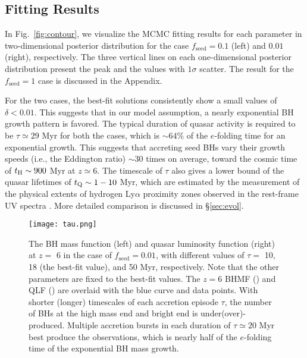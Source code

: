 \documentclass[twocolumn, twocolappendix]{aastex63}
\newcommand{\tlife}{\tau}
\newcommand{\fseed}{f_\mathrm{seed}}
\newcommand{\red}[1]{\textcolor{red}{ #1}}
\begin{document}
\begin{CJK*}{UTF8}{gbsn}
\vspace{2mm}
\subsection{Fitting Results}\label{sec:fitting_result}
In Fig.~\ref{fig:contour}, we visualize the MCMC fitting results for each parameter in two-dimensional 
posterior distribution for the case $\fseed= 0.1$ (left) and $0.01$ (right), respectively.
The three vertical lines on each one-dimensional posterior distribution present the peak and the values
with $1\sigma$ scatter.
The result for the $\fseed=1$ case is discussed in the Appendix.


For the two cases, the best-fit solutions consistently show a small values of $\delta < 0.01$.
This suggests that in our model assumption, a nearly exponential BH growth pattern is favored. 
The typical duration of quasar activity is required to be $\tlife \simeq 29$ Myr for both the cases, 
which is $\sim 64\%$ of the $e$-folding time for an exponential growth.
This suggests that accreting seed BHs vary their growth speeds (i.e., the Eddington ratio) 
$\sim 30$ times on average, toward the cosmic time of $t_{\rm H} \sim 900$ Myr at $z\simeq 6$.
The timescale of $\tlife$ also gives a lower bound of the quasar lifetimes of $t_{\rm Q}\sim 1-10$ Myr, 
which are estimated by the measurement of the physical extents of hydrogen Ly$\alpha$ proximity zones 
observed in the rest-frame UV spectra \citep[e.g.,][]{2018ApJ...867...30E,2019ApJ...884L..19D}.
More detailed comparison is discussed in \S\ref{sec:evol}.


\begin{figure*}
\centering
\texttt{[image: tau.png]}
\caption{
The BH mass function (left) and quasar luminosity function (right) at $z=$ 6 in the case of $\fseed=0.01$, 
with different values of $\tlife=$ 10, 18 (the best-fit value), and 50 Myr, respectively.
Note that the other parameters are fixed to the best-fit values. 
The $z=6$ BHMF () and QLF () 
are overlaid with the blue curve and data points.
With shorter (longer) timescales of each accretion episode $\tlife$, the number of BHs at the high mass end and bright end is under(over)-produced.
Multiple accretion bursts in each duration of $\tau \simeq 20$ Myr best produce the observations,
which is nearly half of the $e$-folding time of the exponential BH mass growth.
}
\label{fig:tau}
\vspace{4mm}
\end{figure*}


\end{CJK*}
\end{document}

